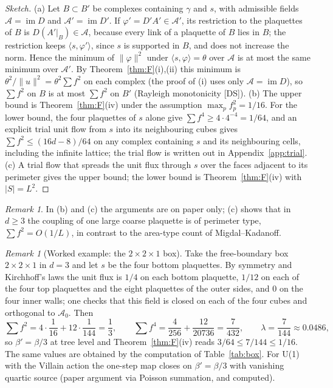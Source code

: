 \documentclass[11pt,a4paper]{article}
\theoremstyle{definition}
\theoremstyle{remark}
\newtheorem{remark}[theorem]{Remark}
\newcommand{\cA}{\mathcal{A}}
\newcommand{\im}{\operatorname{im}}
\begin{document}
\begin{proof}[Sketch]
(a) Let $B\subset B'$ be complexes containing $\gamma$ and $s$, with admissible fields $\cA=\im D$ and $\cA'=\im D'$. If $\varphi'=D'A'\in\cA'$, its restriction to the plaquettes of $B$ is $D(A'|_B)\in\cA$, because every link of a plaquette of $B$ lies in $B$; the restriction keeps $\langle s,\varphi'\rangle$, since $s$ is supported in $B$, and does not increase the norm. Hence the minimum of $\|\varphi\|^2$ under $\langle s,\varphi\rangle=\theta$ over $\cA$ is at most the same minimum over $\cA'$. By Theorem~\ref{thm:F}(i),(ii) this minimum is $\theta^2/\|u\|^2=\theta^2\sum f^2$ on each complex (the proof of (i) uses only $\cA=\im D$), so $\sum f^2$ on $B$ is at most $\sum f^2$ on $B'$ (Rayleigh monotonicity [DS]). (b) The upper bound is Theorem~\ref{thm:F}(iv) under the assumption $\max_pf_p^2=1/16$. For the lower bound, the four plaquettes of $s$ alone give $\sum f^4\ge4\cdot4^{-4}=1/64$, and an explicit trial unit flow from $s$ into its neighbouring cubes gives $\sum f^2\le(16d-8)/64$ on any complex containing $s$ and its neighbouring cells, including the infinite lattice; the trial flow is written out in Appendix~\ref{app:trial}. (c) A trial flow that spreads the unit flux through $s$ over the faces adjacent to its perimeter gives the upper bound; the lower bound is Theorem~\ref{thm:F}(iv) with $|S|=L^2$.
\end{proof}

\begin{remark}
In (b) and (c) the arguments are on paper only; (c) shows that in $d\ge3$ the coupling of one large coarse plaquette is of perimeter type, $\sum f^2=O(1/L)$, in contrast to the area-type count of Migdal--Kadanoff.
\end{remark}

\begin{remark}[Worked example: the $2\times2\times1$ box]\label{rem:221}
Take the free-boundary box $2\times2\times1$ in $d=3$ and let $s$ be the four bottom plaquettes. By symmetry and Kirchhoff's laws the unit flux is $1/4$ on each bottom plaquette, $1/12$ on each of the four top plaquettes and the eight plaquettes of the outer sides, and $0$ on the four inner walls; one checks that this field is closed on each of the four cubes and orthogonal to $\cA_0$. Then
\[
\textstyle\sum f^2=4\cdot\frac1{16}+12\cdot\frac1{144}=\frac13,\qquad
\sum f^4=\frac4{256}+\frac{12}{20736}=\frac7{432},\qquad
\lambda=\frac{7}{144}\approx0.0486,
\]
so $\beta'=\beta/3$ at tree level and Theorem~\ref{thm:F}(iv) reads $3/64\le7/144\le1/16$. The same values are obtained by the computation of Table~\ref{tab:box}. For U(1) with the Villain action the one-step map closes on $\beta'=\beta/3$ with vanishing quartic source (paper argument via Poisson summation, and computed).
\end{remark}
\end{document}

